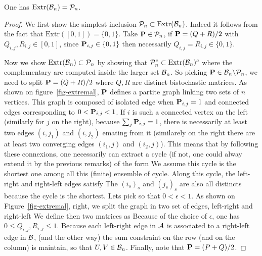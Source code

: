 \begin{thm}\label{thm-birkh-vnm}
	One has $\text{Extr}(\Bb_n) = \Pp_n$.
\end{thm}
\begin{proof}
	We first show the simplest inclusion $\Pp_n \subset \text{Extr}(\Bb_n)$. Indeed it follows from the fact that $\text{Extr}([0,1]) = \{0,1\}$. Take $\P \in \Pp_n$, if $\P=(Q+R)/2$ with $Q_{i,j},R_{i,j} \in [0,1]$, since $\P_{i,j} \in \{0,1\}$ then necessarily $Q_{i,j}=R_{i,j} \in \{0,1\}$.
	
	Now we show $\text{Extr}(\Bb_n) \subset \Pp_n$ by showing that $\Pp_n^c \subset \text{Extr}(\Bb_n)^c$ where the complementary are computed inside the larger set $\Bb_n$. So picking $\P \in \Bb_n \backslash \Pp_n$, we need to split $\P = (Q+R)/2$ where $Q,R$ are distinct bistochastic matrices. 
	As shown on figure~\ref{fig-extremal}, $\P$ defines a partite graph linking two sets of $n$ vertices. 
	This graph is composed of isolated edge when $\P_{i,j}=1$ and connected edges corresponding to $0 < \P_{i,j} <1$.
	If $i$ is such a connected vertex on the left (similarly for $j$ on the right), because $\sum_j \P_{i,j}=1$, there is necessarily at least two edges $(i,j_1)$ and $(i,j_2)$ emating from it (similarely on the right there are at least two converging edges $(i_1,j)$ and $(i_2,j)$). This means that by following these connexions, one necessarily can extract a cycle (if not, one could alway extend it by the previous remarks) of the form
	We assume this cycle is the shortest one among all this (finite) ensemble of cycle. Along this cycle, the left-right and right-left edges satisfy
	The $(i_s)_s$ and $(j_s)_s$ are also all distincts because the cycle is the shortest. Lets pick
	so that $0 < \epsilon < 1$. As shown on Figure~\ref{fig-extremal}, right, we split the graph in two set of edges, left-right and right-left
	We define then two matrices as
	Because of the choice of $\epsilon$, one has $0 \leq Q_{i,j}, R_{i,j} \leq 1$.
	Because each left-right edge in $\Aa$ is associated to a right-left edge in $\Bb$, (and the other way) the
	sum constraint on the row (and on the column) is maintain, so that $U,V \in \Bb_n$. Finally, note that $\P=(P+Q)/2$.	
\end{proof}



